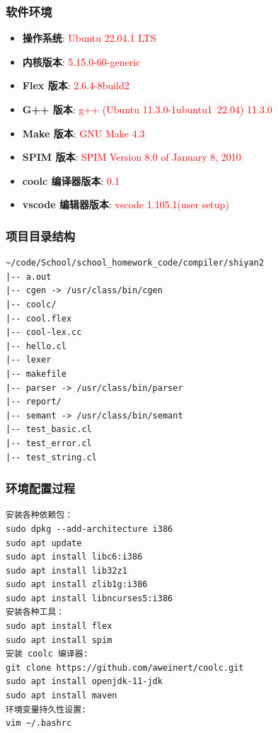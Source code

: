 \documentclass[twocolumn]{article}
\begin{document}
\subsubsection{软件环境}
\begin{itemize}
    \item \textbf{操作系统}: \textcolor{red}{Ubuntu 22.04.1 LTS}
    \item \textbf{内核版本}: \textcolor{red}{5.15.0-60-generic}
    \item \textbf{Flex 版本}: \textcolor{red}{2.6.4-8build2}
    \item \textbf{G++ 版本}: \textcolor{red}{g++ (Ubuntu 11.3.0-1ubuntu1~22.04) 11.3.0}
    \item \textbf{Make 版本}: \textcolor{red}{GNU Make 4.3}
    \item \textbf{SPIM 版本}: \textcolor{red}{SPIM Version 8.0 of January 8, 2010}
    \item \textbf{coolc 编译器版本}: \textcolor{red}{0.1}
    \item \textbf{vscode 编辑器版本}: \textcolor{red}{vscode 1.105.1(user setup)}
\end{itemize}

\subsubsection{项目目录结构}
\begin{verbatim}
~/code/School/school_homework_code/compiler/shiyan2
|-- a.out
|-- cgen -> /usr/class/bin/cgen
|-- coolc/
|-- cool.flex
|-- cool-lex.cc
|-- hello.cl
|-- lexer
|-- makefile
|-- parser -> /usr/class/bin/parser
|-- report/
|-- semant -> /usr/class/bin/semant
|-- test_basic.cl
|-- test_error.cl
|-- test_string.cl            
\end{verbatim}

\subsubsection{环境配置过程}
\begin{verbatim}
安装各种依赖包：
sudo dpkg --add-architecture i386 
sudo apt update 
sudo apt install libc6:i386 
sudo apt install lib32z1 
sudo apt install zlib1g:i386 
sudo apt install libncurses5:i386
安装各种工具：
sudo apt install flex
sudo apt install spim
安装 coolc 编译器:
git clone https://github.com/aweinert/coolc.git
sudo apt install openjdk-11-jdk
sudo apt install maven
环境变量持久性设置:
vim ~/.bashrc
\end{verbatim}
\end{document}
